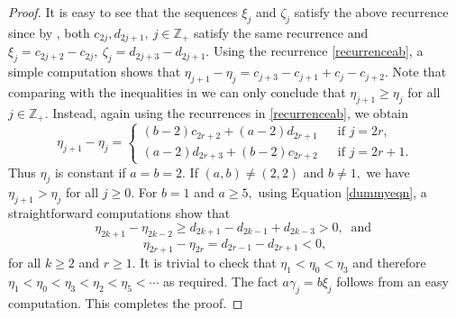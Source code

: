 \documentclass[12pt,reqno]{amsart}
\theoremstyle{plain}
\theoremstyle{definition}
\theoremstyle{remark}
\newcommand\bz{\mathbb Z}
\begin{document}
\begin{proof}
     It is easy to see that the sequences $\xi_j$ and $\zeta_j$ satisfy the above recurrence since by  \cite[Lemma 2.1]{carbone2021commutator}, both $c_{2j},d_{2j+1},\ j\in\bz_+$ satisfy the same recurrence and $\xi_j=c_{2j+2}-c_{2j},\ \zeta_j=d_{2j+3}-d_{2j+1}$.
    Using the recurrence \ref{recurrenceab}, a simple computation shows that $\eta_{j+1}-\eta_j=c_{j+3}-c_{j+1}+c_j-c_{j+2}.$ Note that comparing with the inequalities in \cite[Lemma 3.1]{carbone2021commutator} we can only conclude that $\eta_{j+1}\geq\eta_j$ for all $j\in\bz_+.$ Instead, again using the recurrences in \ref{recurrenceab}, we obtain
    \begin{equation}\label{dummyeqn}
        \eta_{j+1}-\eta_j=\begin{cases}
        (b-2)c_{2r+2}+(a-2)d_{2r+1}\ & \ \text{ if } j=2r,\\
        (a-2)d_{2r+3}+(b-2)c_{2r+2}\ & \ \text{ if } j=2r+1.
    \end{cases}
    \end{equation}
    Thus $\eta_j$ is constant if $a=b=2.$ If $(a,b)\neq (2,2)$ and $b\neq 1,$ we have $\eta_{j+1}>\eta_j$ for all $j\geq 0.$ For $b=1$ and $a\geq 5,$ using Equation \ref{dummyeqn}, a straightforward computations show that 
    $$\eta_{2k+1}-\eta_{2k-2}\geq d_{2k+1}-d_{2k-1}+d_{2k-3}>0,\  \text{ and }$$
    $$\eta_{2r+1}-\eta_{2r}=d_{2r-1}-d_{2r+1}<0,$$
    for all $k\geq 2$ and $r\geq 1.$ It is trivial to check that $\eta_1<\eta_0<\eta_3$ and therefore $\eta_1<\eta_0<\eta_3<\eta_2<\eta_5<\cdots$ as required. The fact $a\gamma_j=b\xi_j$ follows from an easy computation. This completes the proof.

\end{proof}
\end{document}
